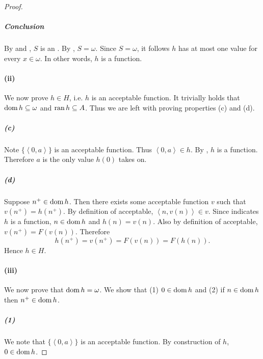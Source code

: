 \documentclass{report}
\newcommand{\pair}[1]{\left< #1 \right>}
\begin{document}
\begin{proof}
    \subparagraph{Conclusion}%

      By  and
        , $S$ is an
        .
      By , $S = \omega$.
      Since $S = \omega$, it follows $h$ has at most one value for every
        $x \in \omega$.
      In other words, $h$ is a function.

  \paragraph{(ii)}%
  \label{par:recursion-theorem-natural-numbers-ii}

    We now prove $h \in H$, i.e. $h$ is an acceptable function.
    It trivially holds that $\mathop{\text{dom}}{h} \subseteq \omega$ and
      $\mathop{\text{ran}}{h} \subseteq A$.
    Thus we are left with proving properties (c) and (d).

    \subparagraph{(c)}%

      Note $\{\pair{0, a}\}$ is an acceptable function.
      Thus $\pair{0, a} \in h$.
      By , $h$ is a function.
      Therefore $a$ is the only value $h(0)$ takes on.

    \subparagraph{(d)}%

      Suppose $n^+ \in \mathop{\text{dom}}{h}$.
      Then there exists some acceptable function $v$ such that
        $v(n^+) = h(n^+)$.
      By definition of acceptable, $\pair{n, v(n)} \in v$.
      Since  indicates $h$ is a
        function, $n \in \mathop{\text{dom}}{h}$ and $h(n) = v(n)$.
      Also by definition of acceptable, $v(n^+) = F(v(n))$.
      Therefore $$h(n^+) = v(n^+) = F(v(n)) = F(h(n)).$$
      Hence $h \in H$.

  \paragraph{(iii)}%
  \label{par:recursion-theorem-natural-numbers-iii}

    We now prove that $\mathop{\text{dom}}{h} = \omega$.
    We show that (1) $0 \in \mathop{\text{dom}}{h}$ and (2) if $n \in \mathop{\text{dom}}{h}$ then
      $n^+ \in \mathop{\text{dom}}{h}$.

    \subparagraph{(1)}%
    \label{spar:recursion-theorem-natural-numbers-iii-1}

      We note that $\{\pair{0, a}\}$ is an acceptable function.
      By construction of $h$, $0 \in \mathop{\text{dom}}{h}$.


\end{proof}
\end{document}
